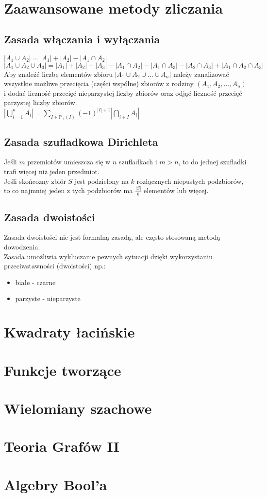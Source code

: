 \documentclass[a4paper,12pt]{article}
\begin{document}
\section{Zaawansowane metody zliczania}
\subsection{Zasada włączania i wyłączania}
	$|A_1\cup A_2| = |A_1| + |A_2| -|A_1\cap A_2|$ \\
	$|A_1\cup A_2\cup A_3| = |A_1| + |A_2| + |A_3|-|A_1\cap A_2| -|A_1\cap A_3| -|A_2\cap A_3|+ |A_1\cap A_2\cap A_3|$\\
	Aby znaleźć liczbę elementów zbioru $|A_1\cup A_2\cup \hdots \cup A_n|$ należy zanalizować wszystkie możliwe przecięcia (części wspólne) zbiorów z rodziny $(A_1, A_2, \dots ,A_n)$ i dodać liczność przecięć nieparzystej liczby zbiorów oraz odjąć liczność przecięć parzystej liczby zbiorów.\\
	$\left| \bigcup\limits_{i=1}^n A_i\right|=\sum\limits_{I\in\mathbb{P}_+(I)} (-1)^{|I|+1} \left| \bigcap\limits_{i\in I} A_i \right|$
\subsection{Zasada szufladkowa Dirichleta}
	Jeśli $m$ przemiotów umieszcza się w $n$ szufladkach i $m>n$, to do jednej szufladki trafi więcej niż jeden przedmiot.\\
	Jeśli skońcozny zbiór $S$ jest podzielony na $k$ rozłącznych niepustych podzbiorów, to co najmniej jeden z tych podzbiorów ma $\frac{|S|}{k}$ elementów lub więcej.
\subsection{Zasada dwoistości}
	Zasada dwoistości nie jest formalną zasadą, ale często stosowaną metodą dowodzenia.\\
	Zasada umożliwia wykluczanie pewnych sytuacji dzięki wykorzystaniu przeciwstawności (dwoistości) np.:
	\begin{itemize}
		\item białe - czarne 
		\item parzyste - nieparzyste
	\end{itemize}
\section{Kwadraty łacińskie}
\section{Funkcje tworzące}
\section{Wielomiany szachowe}
\section{Teoria Grafów II}
\section{Algebry Bool'a}
\end{document}
